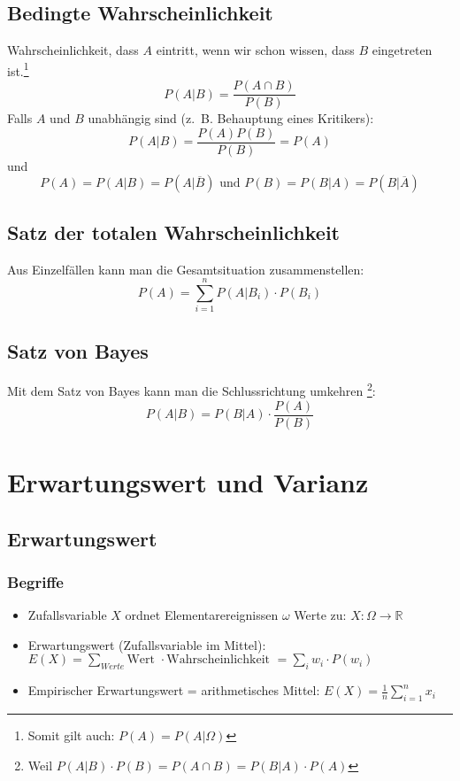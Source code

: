 \subsection{Bedingte Wahrscheinlichkeit}
Wahrscheinlichkeit, dass $A$ eintritt, wenn wir schon wissen, dass $B$
eingetreten ist.\footnote{Somit gilt auch: $P(A) = P(A|\Omega)$}
\[ P(A|B) = \frac{P(A \cap B)}{P(B)} \]
Falls $A$ und $B$ unabhängig sind (z.~B. Behauptung eines Kritikers):
\[ P(A|B) = \frac{P(A) P(B)}{P(B)} = P(A) \]
und
\[P(A) = P(A|B) = P(A|\overline{B}) \text{ und } P(B) = P(B|A)
= P(B|\overline{A})\]


\subsection{Satz der totalen Wahrscheinlichkeit}
Aus Einzelfällen kann man die Gesamtsituation zusammenstellen:
\[ P(A) = \sum_{i=1}^{n}P(A|B_i) \cdot P(B_i) \]

\subsection{Satz von Bayes}
Mit dem Satz von Bayes kann man die Schlussrichtung umkehren
\footnote{Weil $P(A|B) \cdot P(B) = P(A \cap B) = P(B|A) \cdot P(A)$}:
\[ P(A|B) = P(B|A) \cdot \frac{P(A)}{P(B)} \]

\section{Erwartungswert und Varianz}
\subsection{Erwartungswert}
\subsubsection{Begriffe}
\begin{itemize}
  \item Zufallsvariable $X$ ordnet Elementarereignissen $\omega$ Werte
    zu: $X: \Omega \rightarrow \mathbb{R}$
  \item Erwartungswert (Zufallsvariable im Mittel): \\
    $E(X) = \sum_{Werte} \text{Wert } \cdot
    \text{Wahrscheinlichkeit } = \sum_i w_i \cdot P(w_i)$
  \item Empirischer Erwartungswert = arithmetisches Mittel:
    $E(X) = \frac{1}{n} \sum_{i=1}^n x_i$
\end{itemize}
